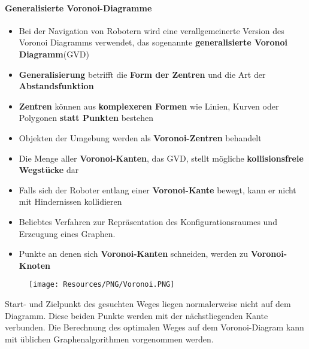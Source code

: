 \paragraph{Generalisierte Voronoi-Diagramme}
\begin{itemize}
	\item Bei der Navigation von Robotern wird eine verallgemeinerte Version des Voronoi Diagramms verwendet, das sogenannte \textbf{generalisierte Voronoi Diagramm}(GVD)
	\item \textbf{Generalisierung} betrifft die \textbf{Form der Zentren} und die Art der \textbf{Abstandsfunktion}
	\item \textbf{Zentren} können aus \textbf{komplexeren Formen} wie Linien, Kurven oder Polygonen \textbf{statt Punkten} bestehen
	\item Objekten der Umgebung werden als \textbf{Voronoi-Zentren} behandelt
	\item Die Menge aller \textbf{Voronoi-Kanten}, das GVD, stellt mögliche \textbf{kollisionsfreie Wegstücke} dar
	\item Falls sich der Roboter entlang einer \textbf{Voronoi-Kante} bewegt, kann er nicht mit Hindernissen kollidieren
	\item Beliebtes Verfahren zur Repräsentation des Konfigurationsraumes und Erzeugung eines Graphen.
	\item Punkte an denen sich \textbf{Voronoi-Kanten} schneiden, werden zu \textbf{Voronoi-Knoten}
\end{itemize}
\begin{figure}[H]
	\begin{center}
		\texttt{[image: Resources/PNG/Voronoi.PNG]}
		\caption{}
		\label{fig:PNG/Voronoi.PNG}
	\end{center}
\end{figure}
Start- und Zielpunkt des gesuchten Weges liegen normalerweise nicht auf dem Diagramm.
Diese beiden Punkte werden mit der nächstliegenden Kante verbunden.
Die Berechnung des optimalen Weges auf dem Voronoi-Diagram kann mit üblichen Graphenalgorithmen vorgenommen werden.
